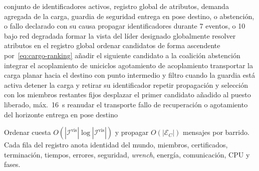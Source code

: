 \begin{algorithm}[!htbp]
\caption{Demostrador Cargo híbrido: selección, acoplamiento, transporte y sustitución}
\label{alg:cargo-hibrido}
\begin{algorithmic}[1]
\Require conjunto de identificadores activos, registro global de atributos,
         demanda agregada de la carga, guardia de seguridad
\Ensure entrega en pose destino, o abstención, o fallo declarado con su causa
\State propagar identificadores durante 7 eventos, o 10 bajo red degradada
\State formar la vista del líder designado globalmente
\State resolver atributos en el registro global
\State ordenar candidatos de forma ascendente por~\eqref{eq:cargo-ranking}
  \State añadir el siguiente candidato a la coalición
\EndWhile
{}
  \State \Return abstención
\EndIf
\State integrar el acoplamiento de uniciclos
  \State \Return agotamiento de acoplamiento
\EndIf
\State transportar la carga planar hacia el destino con punto intermedio y
       filtro cuando la guardia está activa
  \State detener la carga y retirar su identificador
  \State repetir propagación y selección con los miembros restantes fijos
  \State desplazar el primer candidato añadido al puesto liberado, máx.\ 16~s
    \State reanudar el transporte
  \Else
    \State \Return fallo de recuperación o agotamiento del horizonte
  \EndIf
\EndIf
\State \Return entrega en pose destino
\end{algorithmic}
\end{algorithm}

Ordenar cuesta $O(|\mathcal I^{\mathrm{vis}}|\log |\mathcal I^{\mathrm{vis}}|)$ y
propagar $O(|\mathcal E_C|)$ mensajes por barrido. Cada fila del registro anota
identidad del mundo, miembros, certificados, terminación, tiempos, errores,
seguridad, \emph{wrench}, energía, comunicación, CPU y fases.

